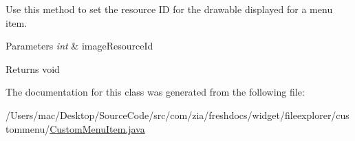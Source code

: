 Use this method to set the resource I\-D for the drawable displayed for a menu item. 
\begin{DoxyParams}{Parameters}
{\em int} & image\-Resource\-Id \\
\hline
\end{DoxyParams}
\begin{DoxyReturn}{Returns}
void 
\end{DoxyReturn}


The documentation for this class was generated from the following file\-:\begin{DoxyCompactItemize}
\item 
/\-Users/mac/\-Desktop/\-Source\-Code/src/com/zia/freshdocs/widget/fileexplorer/custommenu/\hyperlink{_custom_menu_item_8java}{Custom\-Menu\-Item.\-java}\end{DoxyCompactItemize}
